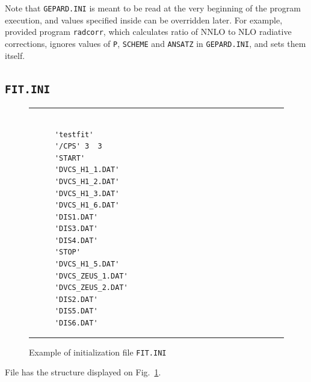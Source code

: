 \documentclass[12pt]{article}
\begin{document}
Note that \texttt{GEPARD.INI} is meant to be read at the very beginning of the
program execution, and values specified inside can be overridden later. For
example, provided program \texttt{radcorr}, which calculates ratio of NNLO to NLO
radiative corrections, ignores values of \texttt{P}, \texttt{SCHEME} and
\texttt{ANSATZ} in \texttt{GEPARD.INI}, and sets them itself.


\subsection{\texttt{FIT.INI}}

\begin{figure}[t]
\begin{center}
\hrule
\begin{verbatim}

      'testfit'
      '/CPS' 3  3
      'START'
      'DVCS_H1_1.DAT'
      'DVCS_H1_2.DAT'
      'DVCS_H1_3.DAT'
      'DVCS_H1_6.DAT'
      'DIS1.DAT'
      'DIS3.DAT'
      'DIS4.DAT'
      'STOP'
      'DVCS_H1_5.DAT'
      'DVCS_ZEUS_1.DAT'
      'DVCS_ZEUS_2.DAT'
      'DIS2.DAT'
      'DIS5.DAT'
      'DIS6.DAT'

\end{verbatim}
\hrule
\end{center}
\caption{Example of initialization file \texttt{FIT.INI}}
\label{fig:FIT.INI}
\end{figure}

File has the structure displayed on Fig.~\ref{fig:FIT.INI}.
\end{document}
